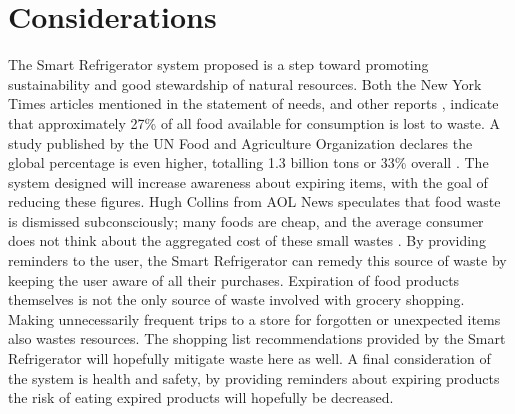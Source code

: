 \documentclass[11pt]{article} %
\begin{document}
\section{Considerations}
The Smart Refrigerator system proposed is a step toward promoting sustainability and good stewardship of natural resources. Both the New York Times articles mentioned in the statement of needs, and other reports \cite{times, aol}, indicate that approximately 27\% of all food available for consumption is lost to waste. A study published by the UN Food and Agriculture Organization declares the global percentage is even higher, totalling 1.3 billion tons or 33\% overall \cite{dutch}. The system designed will increase awareness about expiring items, with the goal of reducing these figures. Hugh Collins from AOL News speculates that food waste is dismissed subconsciously; many foods are cheap, and the average consumer does not think about the aggregated cost of these small wastes \cite{aol}. By providing reminders to the user, the Smart Refrigerator can remedy this source of waste by keeping the user aware of all their purchases. Expiration of food products themselves is not the only source of waste involved with grocery shopping. Making unnecessarily frequent trips to a store for forgotten or unexpected items also wastes resources. The shopping list recommendations provided by the Smart Refrigerator will hopefully mitigate waste here as well. A final consideration of the system is health and safety, by providing reminders about expiring products the risk of eating expired products will hopefully be decreased. 
\pagebreak
\end{document}
